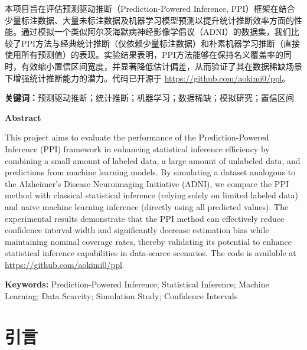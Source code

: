\documentclass[12pt,a4paper]{article}
\begin{document}
\indent 本项目旨在评估预测驱动推断（Prediction-Powered Inference, PPI）框架在结合少量标注数据、大量未标注数据及机器学习模型预测以提升统计推断效率方面的性能。通过模拟一个类似阿尔茨海默病神经影像学倡议（ADNI）的数据集，我们比较了PPI方法与经典统计推断（仅依赖少量标注数据）和朴素机器学习推断（直接使用所有预测值）的表现。实验结果表明，PPI方法能够在保持名义覆盖率的同时，有效缩小置信区间宽度，并显著降低估计偏差，从而验证了其在数据稀缺场景下增强统计推断能力的潜力。代码已开源于 \url{https://github.com/aokimi0/ppl}。

\vspace{1em}
\noindent\textbf{关键词：}预测驱动推断；统计推断；机器学习；数据稀缺；模拟研究；置信区间

\clearpage
{}
{}
\begin{center}
    {\bfseries Abstract}
\end{center}
\vspace{0.5em}
\small
\setlength{\parindent}{2em}

\indent This project aims to evaluate the performance of the Prediction-Powered Inference (PPI) framework in enhancing statistical inference efficiency by combining a small amount of labeled data, a large amount of unlabeled data, and predictions from machine learning models. By simulating a dataset analogous to the Alzheimer's Disease Neuroimaging Initiative (ADNI), we compare the PPI method with classical statistical inference (relying solely on limited labeled data) and naive machine learning inference (directly using all predicted values). The experimental results demonstrate that the PPI method can effectively reduce confidence interval width and significantly decrease estimation bias while maintaining nominal coverage rates, thereby validating its potential to enhance statistical inference capabilities in data-scarce scenarios. The code is available at \url{https://github.com/aokimi0/ppl}.

\vspace{1em}
\noindent\textbf{Keywords:} Prediction-Powered Inference; Statistical Inference; Machine Learning; Data Scarcity; Simulation Study; Confidence Intervals

\clearpage
\tableofcontents
\clearpage

\section{引言}
\end{document}
